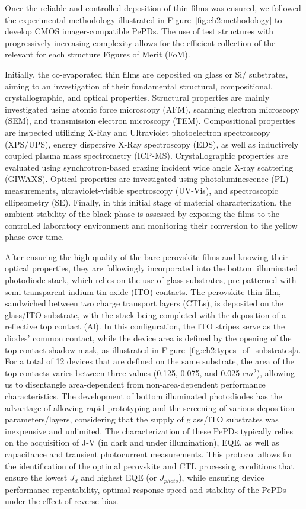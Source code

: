 Once the reliable and controlled deposition of  thin films was ensured, we followed the experimental methodology illustrated in Figure~\ref{fig:ch2:methodology} to develop CMOS imager-compatible PePDs. The use of test structures with progressively increasing complexity allows for the efficient collection of the relevant for each structure Figures of Merit (FoM). 

Initially, the co-evaporated  thin films are deposited on glass or Si/ substrates, aiming to an investigation of their fundamental structural, compositional, crystallographic, and optical properties. Structural properties are mainly investigated using atomic force microscopy (AFM), scanning electron microscopy (SEM), and transmission electron microscopy (TEM). Compositional properties are inspected utilizing X-Ray and Ultraviolet photoelectron spectroscopy (XPS/UPS), energy dispersive X-Ray spectroscopy (EDS), as well as inductively coupled plasma mass spectrometry (ICP-MS). Crystallographic properties are evaluated using synchrotron-based grazing incident wide angle X-ray scattering (GIWAXS). Optical properties are investigated using photoluminescence (PL) measurements, ultraviolet-visible spectroscopy (UV-Vis), and spectroscopic ellipsometry (SE). Finally, in this initial stage of material characterization, the ambient stability of the  black phase is assessed by exposing the films to the controlled laboratory environment and monitoring their conversion to the yellow phase over time.

After ensuring the high quality of the bare perovskite films and knowing their optical properties, they are followingly incorporated into the bottom illuminated photodiode stack, which relies on the use of glass substrates, pre-patterned with semi-transparent indium tin oxide (ITO) contacts. The perovskite thin film, sandwiched between two charge transport layers (CTLs), is deposited on the glass/ITO substrate, with the stack being completed with the deposition of a reflective top contact (Al). In this configuration, the ITO stripes serve as the diodes' common contact, while the device area is defined by the opening of the top contact shadow mask, as illustrated in Figure~\ref{fig:ch2:types_of_substrates}a. For a total of 12 devices that are defined on the same substrate, the area of the top contacts varies between three values (0.125, 0.075, and 0.025 $cm^2$), allowing us to disentangle area-dependent from non-area-dependent performance characteristics. The development of bottom illuminated photodiodes has the advantage of allowing rapid prototyping and the screening of various deposition parameters/layers, considering that the supply of glass/ITO substrates was inexpensive and unlimited. The characterization of these PePDs typically relies on the acquisition of J-V (in dark and under illumination), EQE, as well as capacitance and transient photocurrent measurements. This protocol allows for the identification of the optimal perovskite and CTL processing conditions that ensure the lowest $J_d$ and highest EQE (or $J_{photo}$), while ensuring device performance repeatability, optimal response speed and stability of the PePDs under the effect of reverse bias. 

